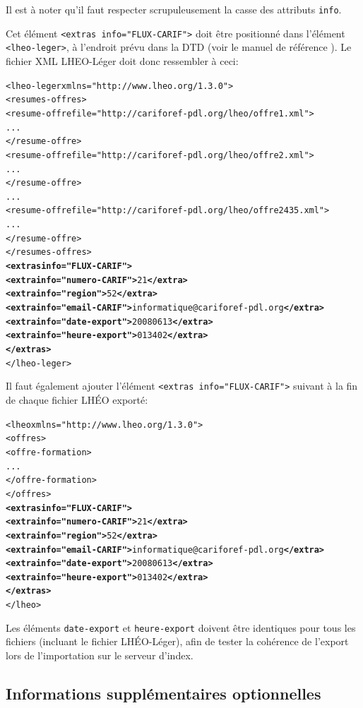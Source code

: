 \documentclass[a4paper]{report}
\begin{document}
Il est à noter qu'il faut respecter scrupuleusement la casse des
attributs \texttt{info}.

Cet élément \texttt{<extras info="FLUX-CARIF">} doit être positionné
dans l'élément \texttt{<lheo-leger>}, à l'endroit prévu dans la DTD
(voir le manuel de référence \cite{MANUEL-LHEO}). Le fichier XML
LHEO-Léger doit donc ressembler à ceci:

\begin{alltt}
<lheo-leger xmlns="http://www.lheo.org/1.3.0">
  <resumes-offres>
    <resume-offre file="http://cariforef-pdl.org/lheo/offre1.xml">
      ...
    </resume-offre>
    <resume-offre file="http://cariforef-pdl.org/lheo/offre2.xml">
      ...
    </resume-offre>
    ...
    <resume-offre file="http://cariforef-pdl.org/lheo/offre2435.xml">
      ...
    </resume-offre>    
  </resumes-offres>
  \textbf{<extras info="FLUX-CARIF">}
    \textbf{<extra info="numero-CARIF">}21\textbf{</extra>}
    \textbf{<extra info="region">}52\textbf{</extra>}
    \textbf{<extra info="email-CARIF">}informatique@cariforef-pdl.org\textbf{</extra>}
    \textbf{<extra info="date-export">}20080613\textbf{</extra>}
    \textbf{<extra info="heure-export">}013402\textbf{</extra>}
  \textbf{</extras>}
</lheo-leger>
\end{alltt}

Il faut également ajouter l'élément \texttt{<extras info="FLUX-CARIF">} suivant
à la fin de chaque fichier LHÉO exporté:

\begin{alltt}
<lheo xmlns="http://www.lheo.org/1.3.0">
  <offres>
    <offre-formation>
      ...
    </offre-formation>    
  </offres>
  \textbf{<extras info="FLUX-CARIF">}
    \textbf{<extra info="numero-CARIF">}21\textbf{</extra>}
    \textbf{<extra info="region">}52\textbf{</extra>}
    \textbf{<extra info="email-CARIF">}informatique@cariforef-pdl.org\textbf{</extra>}
    \textbf{<extra info="date-export">}20080613\textbf{</extra>}
    \textbf{<extra info="heure-export">}013402\textbf{</extra>}
  \textbf{</extras>}
</lheo>
\end{alltt}

Les éléments \texttt{date-export} et \texttt{heure-export} doivent être
identiques pour tous les fichiers (incluant le fichier LHÉO-Léger),
afin de tester la cohérence de l'export lors de l'importation sur le
serveur d'index.

\subsection{Informations supplémentaires optionnelles}
\end{document}
